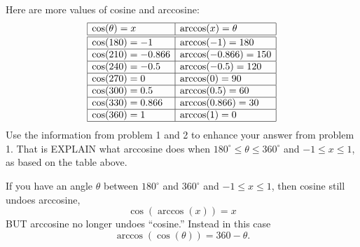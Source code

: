 \documentclass[noauthor,nooutcomes,12pt,handout,hints]{ximera}
\begin{document}
\begin{question}
  Here are more values of cosine and arccosine:
  \[
  \begin{array}{|l|l|}
    \hline
    \cos(\theta) =x      & \arccos(x) = \theta\\ \hline\hline
    \cos(180) =-1      & \arccos(-1) = 180\\ \hline
    \cos(210) = -0.866 & \arccos(-0.866) = 150\\ \hline
    \cos(240) = -0.5   & \arccos(-0.5) = 120\\ \hline
    \cos(270) = 0      & \arccos(0) = 90\\ \hline
    \cos(300) = 0.5     & \arccos(0.5) = 60\\ \hline
    \cos(330) = 0.866   & \arccos(0.866) = 30\\ \hline
    \cos(360)  = 1     & \arccos(1) = 0 \\    \hline
  \end{array}
  \]
  Use the information from problem 1 and 2 to enhance your answer from
  problem 1. That is EXPLAIN what arccosine does when $180^\circ \le
  \theta \le 360^\circ$ and $-1\le x\le 1$, as based on the table
  above.
  \begin{freeResponse}
    If you have an angle $\theta$ between $180^\circ$ and $360^\circ$
    and $-1\le x\le 1$, then cosine still undoes arccosine,
    \[
    \cos(\arccos(x)) = x
    \]
    BUT arccosine no longer undoes ``cosine.'' Instead in this case
    \[
    \arccos(\cos(\theta)) = 360-\theta.
    \]
  \end{freeResponse}
\end{question}
\mynewpage
\end{document}
